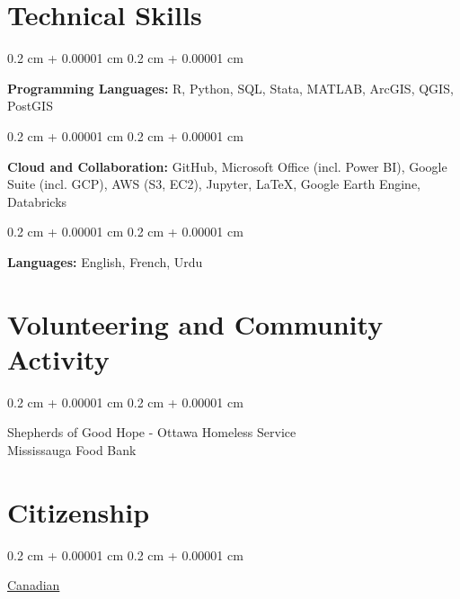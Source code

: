 \documentclass[10pt, letterpaper]{article}
\newenvironment{onecolentry}{
    \begin{adjustwidth}{
        0.2 cm + 0.00001 cm
    }{
        0.2 cm + 0.00001 cm
    }
}{
    \end{adjustwidth}
} %
\let\hrefWithoutArrow\href
\renewcommand{\href}[2]{\hrefWithoutArrow{#1}{\ifthenelse{\equal{#2}{}}{ }{#2 }\raisebox{.15ex}{\footnotesize \faExternalLink*}}}
\begin{document}
    
    \section{Technical Skills}

        \begin{onecolentry}
            \textbf{Programming Languages:} R, Python, SQL, Stata, MATLAB, ArcGIS, QGIS, PostGIS
        \end{onecolentry}

\vspace{0.2 cm}

        \begin{onecolentry}
            \textbf{Cloud and Collaboration:} GitHub, Microsoft Office (incl. Power BI), Google Suite (incl. GCP), AWS (S3, EC2), Jupyter, \LaTeX, Google Earth Engine, Databricks
        \end{onecolentry}
        
\vspace{0.2 cm}

        \begin{onecolentry}
            \textbf{Languages:} English, French, Urdu
        \end{onecolentry}

        \vspace{0.2 cm}
\section{Volunteering and Community Activity}
        \begin{onecolentry}
        Shepherds of Good Hope - Ottawa Homeless Service \\
            Mississauga Food Bank 
        \end{onecolentry}
\section{Citizenship}
    \begin{onecolentry}
  \mbox{\hrefWithoutArrow{}{\color{red}{\footnotesize\faCanadianMapleLeaf}\hspace*{0.10cm}\color{black}Canadian}}%
    \end{onecolentry}
    
        
\end{document}
